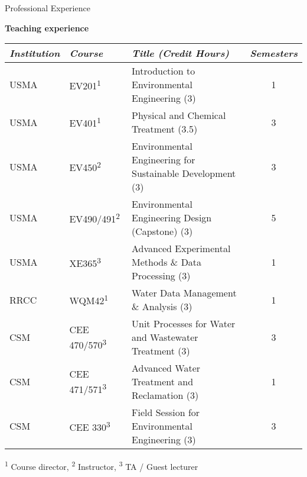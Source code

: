 \documentclass{resume} %
\begin{document}
\begin{rSection}{Professional Experience}
\\

\begin{table}[h]
\centering
\textbf{Teaching experience}
\begin{tabular}{lllc}
\toprule
  \emph{Institution} & \emph{Course} & \emph{Title (Credit Hours)} & \emph{Semesters}\\
\midrule			
  USMA & EV201\textsuperscript{1}& Introduction to Environmental Engineering (3) & 1  \\
  USMA & EV401\textsuperscript{1} & Physical and Chemical Treatment (3.5) & 3  \\
  USMA & EV450\textsuperscript{2} & Environmental Engineering for Sustainable Development (3) & 3 \\
  USMA & EV490/491\textsuperscript{2} & Environmental Engineering Design (Capstone) (3) & 5  \\
  USMA & XE365\textsuperscript{3} & Advanced Experimental Methods \& Data Processing (3) & 1  \\
  RRCC & WQM42\textsuperscript{1} & Water Data Management \& Analysis (3) & 1 \\
  CSM & CEE 470/570\textsuperscript{3} & Unit Processes for Water and Wastewater Treatment (3) & 3 \\
  CSM & CEE 471/571\textsuperscript{3} & Advanced Water Treatment and Reclamation (3) & 1 \\
  CSM & CEE 330\textsuperscript{3} & Field Session for Environmental Engineering (3) & 3  \\
\bottomrule
\end{tabular}

\smallskip\footnotesize{\textsuperscript{1} Course director, \textsuperscript{2} Instructor, \textsuperscript{3} TA / Guest lecturer}

\end{table}

\end{rSection}

\end{document}
